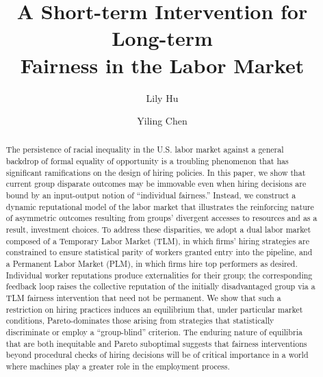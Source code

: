 \documentclass[sigconf]{acmart}
\theoremstyle{definition}
\begin{document}
\title[A Short-term Intervention for Long-term Fairness in the Labor Market]{A Short-term Intervention for Long-term\\ Fairness in the Labor Market}
\author{Lily Hu}
\author{Yiling Chen}

%

\begin{abstract}
The persistence of racial inequality in the U.S. labor market against a general backdrop of formal equality of opportunity is a troubling phenomenon that has significant ramifications on the design of hiring policies. In this paper, we show that current group disparate outcomes may be immovable even when hiring decisions are bound by an input-output notion of ``individual fairness.'' Instead, we construct a dynamic reputational model of the labor market that illustrates the reinforcing nature of asymmetric outcomes resulting from groups' divergent accesses to resources and as a result, investment choices. To address these disparities, we adopt a dual labor market composed of a Temporary Labor Market (TLM), in which firms' hiring strategies are constrained to ensure statistical parity of workers granted entry into the pipeline, and a Permanent Labor Market (PLM), in which firms hire top performers as desired. Individual worker reputations produce externalities for their group; the corresponding feedback loop raises the collective reputation of the initially disadvantaged group via a TLM fairness intervention that need not be permanent. We show that such a restriction on hiring practices induces an equilibrium that, under particular market conditions, Pareto-dominates those arising from strategies that statistically discriminate or employ a ``group-blind'' criterion. The enduring nature of equilibria that are both inequitable and Pareto suboptimal suggests that fairness interventions beyond procedural checks of hiring decisions will be of critical importance in a world where machines play a greater role in the employment process.
\end{abstract}
\maketitle
\end{document}

